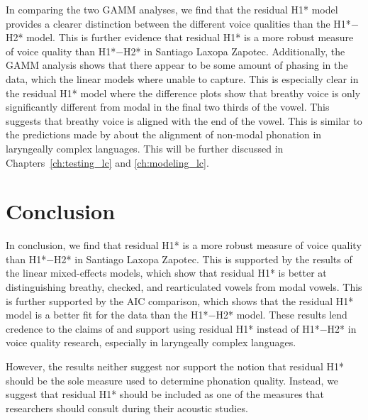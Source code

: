 In comparing the two GAMM analyses, we find that the residual H1* model provides a clearer distinction between the different voice qualities than the H1*$-$H2* model. This is further evidence that residual H1* is a more robust measure of voice quality than H1*$-$H2* in Santiago Laxopa Zapotec. Additionally, the GAMM analysis shows that there appear to be some amount of phasing in the data, which the linear models where unable to capture. This is especially clear in the residual H1* model where the difference plots show that breathy voice is only significantly different from modal in the final two thirds of the vowel. This suggests that breathy voice is aligned with the end of the vowel. This is similar to the predictions made by \citet{silvermanLaryngealComplexityOtomanguean1997,silvermanPhasingRecoverability1997} about the alignment of non-modal phonation in laryngeally complex languages. This will be further discussed in Chapters~\ref{ch:testing_lc} and \ref{ch:modeling_lc}.

\section{Conclusion} \label{sec:Conclusion}

In conclusion, we find that residual H1* is a more robust measure of voice quality than H1*$-$H2* in Santiago Laxopa Zapotec. This is supported by the results of the linear mixed-effects models, which show that residual H1* is better at distinguishing breathy, checked, and rearticulated vowels from modal vowels. This is further supported by the AIC comparison, which shows that the residual H1* model is a better fit for the data than the H1*$-$H2* model. These results lend credence to the claims of \citet{chaiH1H2Acoustic2022} and support using residual H1* instead of H1*$-$H2* in voice quality research, especially in laryngeally complex languages.

However, the results neither suggest nor support the notion that residual H1* should be the sole measure used to determine phonation quality. Instead, we suggest that residual H1* should be included as one of the measures that researchers should consult during their acoustic studies. 